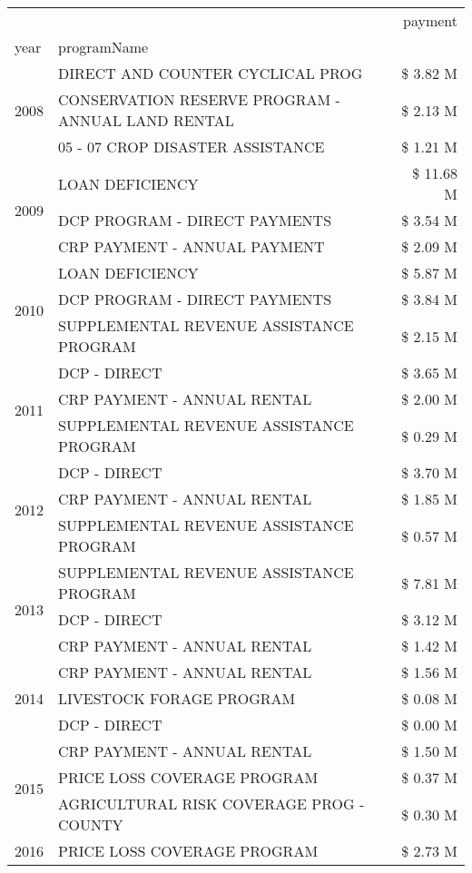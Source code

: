 \begin{tabular}{llr}
\toprule
 &  & payment \\
year & programName &  \\
\midrule
\multirow[t]{3}{*}{2008} & DIRECT AND COUNTER CYCLICAL PROG & \$ 3.82 M \\
 & CONSERVATION RESERVE PROGRAM - ANNUAL LAND RENTAL & \$ 2.13 M \\
 & 05 - 07 CROP DISASTER ASSISTANCE & \$ 1.21 M \\
\cline{1-3}
\multirow[t]{3}{*}{2009} & LOAN DEFICIENCY & \$ 11.68 M \\
 & DCP PROGRAM - DIRECT PAYMENTS & \$ 3.54 M \\
 & CRP PAYMENT - ANNUAL PAYMENT & \$ 2.09 M \\
\cline{1-3}
\multirow[t]{3}{*}{2010} & LOAN DEFICIENCY & \$ 5.87 M \\
 & DCP PROGRAM - DIRECT PAYMENTS & \$ 3.84 M \\
 & SUPPLEMENTAL REVENUE ASSISTANCE PROGRAM & \$ 2.15 M \\
\cline{1-3}
\multirow[t]{3}{*}{2011} & DCP - DIRECT & \$ 3.65 M \\
 & CRP PAYMENT - ANNUAL RENTAL & \$ 2.00 M \\
 & SUPPLEMENTAL REVENUE ASSISTANCE PROGRAM & \$ 0.29 M \\
\cline{1-3}
\multirow[t]{3}{*}{2012} & DCP - DIRECT & \$ 3.70 M \\
 & CRP PAYMENT - ANNUAL RENTAL & \$ 1.85 M \\
 & SUPPLEMENTAL REVENUE ASSISTANCE PROGRAM & \$ 0.57 M \\
\cline{1-3}
\multirow[t]{3}{*}{2013} & SUPPLEMENTAL REVENUE ASSISTANCE PROGRAM & \$ 7.81 M \\
 & DCP - DIRECT & \$ 3.12 M \\
 & CRP PAYMENT - ANNUAL RENTAL & \$ 1.42 M \\
\cline{1-3}
\multirow[t]{3}{*}{2014} & CRP PAYMENT - ANNUAL RENTAL & \$ 1.56 M \\
 & LIVESTOCK FORAGE PROGRAM & \$ 0.08 M \\
 & DCP - DIRECT & \$ 0.00 M \\
\cline{1-3}
\multirow[t]{3}{*}{2015} & CRP PAYMENT - ANNUAL RENTAL & \$ 1.50 M \\
 & PRICE LOSS COVERAGE PROGRAM & \$ 0.37 M \\
 & AGRICULTURAL RISK COVERAGE PROG - COUNTY & \$ 0.30 M \\
\cline{1-3}
\multirow[t]{3}{*}{2016} & PRICE LOSS COVERAGE PROGRAM & \$ 2.73 M \\

\end{tabular}
